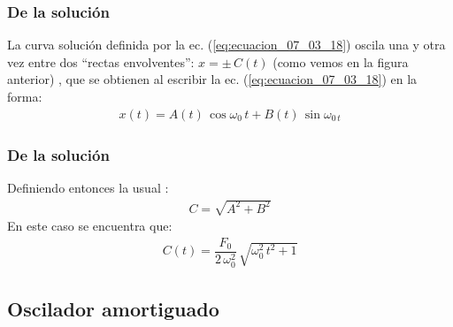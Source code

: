 \begin{frame}
\frametitle{De la solución}
La curva solución definida por la ec. (\ref{eq:ecuacion_07_03_18}) oscila una y otra vez entre dos \enquote{rectas envolventes}: $x = \pm \, C(t)$ (como vemos en la figura anterior) , que se obtienen al escribir la ec. (\ref{eq:ecuacion_07_03_18}) en la forma:
\pause
\begin{align*}
x(t) =  A(t) \, \cos \omega_{0} \, t +  B(t) \, \sin \omega_{0 \, t}
\end{align*}
\end{frame}
\begin{frame}
\frametitle{De la solución}
Definiendo entonces la usual :
\pause
\begin{align*}
C = \sqrt{A^{2} +  B^{2}}
\end{align*}
\pause
En este caso se encuentra que:
\pause
\begin{align*}
C(t) = \dfrac{F_{0}}{2 \, \omega_{0}^{2}} \, \sqrt{\omega_{0}^{2} \, t^{2} + 1}
\end{align*}
\end{frame}

\subsection{Oscilador amortiguado}

